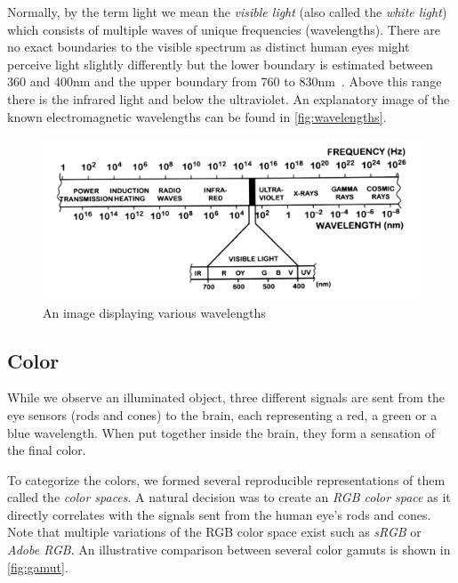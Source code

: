 Normally, by the term light we mean the \emph{visible light} (also called the \emph{white light}) which consists of multiple waves of unique frequencies (wavelengths). There are no exact boundaries to the visible spectrum as distinct human eyes might perceive light slightly differently but the lower boundary is estimated between 360 and 400nm and the upper boundary from 760 to 830nm~\cite{sliney2016light}. Above this range there is the infrared light and below the ultraviolet. An explanatory image of the known electromagnetic wavelengths can be found in \autoref{fig:wavelengths}.

\begin{figure}[h]
	\centering
	\includegraphics[width=0.8\linewidth]{img/wavelengths.png}
	\caption{An image displaying various wavelengths~\cite{colorScienceSlides}}
	\label{fig:wavelengths}
\end{figure}

\subsection{Color}

While we observe an illuminated object, three different signals are sent from the eye sensors (rods and cones) to the brain, each representing a red, a green or a blue wavelength. When put together inside the brain, they form a sensation of the final color. 

To categorize the colors, we formed several reproducible representations of them called the \emph{color spaces}. A natural decision was to create an \emph{RGB color space} as it directly correlates with the signals sent from the human eye's rods and cones. Note that multiple variations of the RGB color space exist such as \emph{sRGB} or \emph{Adobe RGB}. An illustrative comparison between several color gamuts is shown in \autoref{fig:gamut}.

